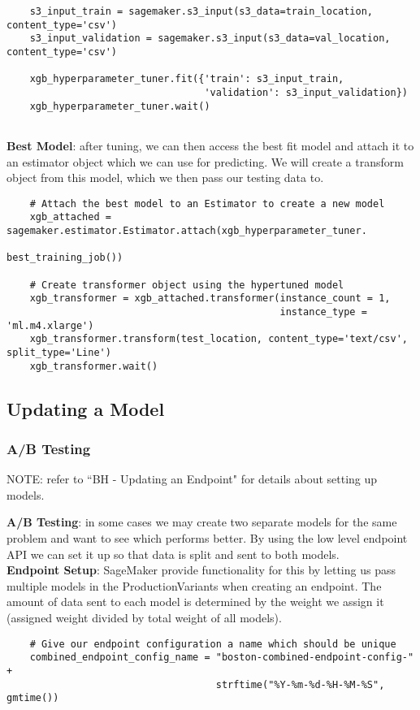 \documentclass[11pt, a4paper]{article}
\begin{document}
\begin{spacing}{1.1}
\begin{lstlisting}
	s3_input_train = sagemaker.s3_input(s3_data=train_location, content_type='csv')
	s3_input_validation = sagemaker.s3_input(s3_data=val_location, content_type='csv')
	
	xgb_hyperparameter_tuner.fit({'train': s3_input_train, 
		                          'validation': s3_input_validation})
	xgb_hyperparameter_tuner.wait()
	
	\end{lstlisting}\vspace*{2mm}
	\textbf{Best Model}: after tuning, we can then access the best fit model and attach it to an estimator object which we can use for predicting. We will create a transform object from this model, which we then pass our testing data to.
	\begin{lstlisting}
	# Attach the best model to an Estimator to create a new model
	xgb_attached = sagemaker.estimator.Estimator.attach(xgb_hyperparameter_tuner.
	                                                    best_training_job())
	
	# Create transformer object using the hypertuned model
	xgb_transformer = xgb_attached.transformer(instance_count = 1, 
	                                           instance_type = 'ml.m4.xlarge')
	xgb_transformer.transform(test_location, content_type='text/csv', split_type='Line')
	xgb_transformer.wait()
	\end{lstlisting} \newpage

	\subsection{Updating a Model}
	\subsubsection{A/B Testing}
	\begin{center}
	\color{darkgray} NOTE: refer to ``BH - Updating an Endpoint" for details about setting up models. \color{black}
	\end{center} \vspace*{1mm}
	\textbf{A/B Testing}: in some cases we may create two separate models for the same problem and want to see which performs better. By using the low level endpoint API we can set it up so that data is split and sent to both models. \vspace*{2mm}\\
	\textbf{Endpoint Setup}: SageMaker provide functionality for this by letting us pass multiple models in the ProductionVariants when creating an endpoint. The amount of data sent to each model is determined by the weight we assign it (assigned weight divided by total weight of all models).
	\begin{lstlisting}
	# Give our endpoint configuration a name which should be unique
	combined_endpoint_config_name = "boston-combined-endpoint-config-" + 
	                                strftime("%Y-%m-%d-%H-%M-%S", gmtime())
	

\end{lstlisting}
\end{spacing}
\end{document}
